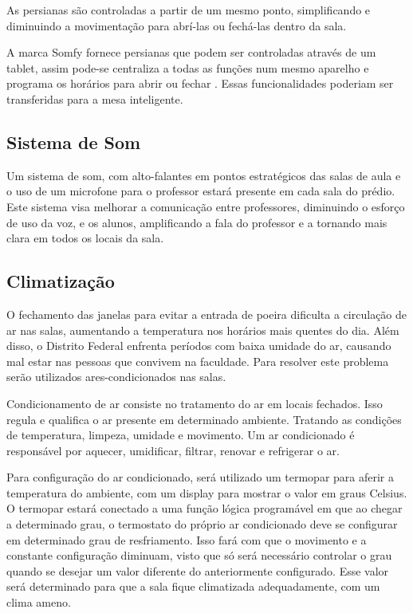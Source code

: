 As persianas são controladas a partir de um mesmo ponto, simplificando e diminuindo a movimentação para abrí-las ou fechá-las dentro da sala.

A marca Somfy fornece persianas que podem ser controladas através de um tablet, assim pode-se centraliza a todas as funções num mesmo aparelho e programa os horários para abrir ou fechar \cite{somfy2017}. Essas funcionalidades poderiam ser transferidas para a mesa inteligente.

\subsection{Sistema de Som}
Um sistema de som, com alto-falantes em pontos estratégicos das salas de aula e o uso de um microfone para o professor estará presente em cada sala do prédio. Este sistema visa melhorar a comunicação entre professores, diminuindo o esforço de uso da voz, e os alunos, amplificando a fala do professor e a tornando mais clara em todos os locais da sala.

\subsection{Climatização}
O fechamento das janelas para evitar a entrada de poeira dificulta a circulação de ar nas salas, aumentando a temperatura nos horários mais quentes do dia. Além disso, o Distrito Federal enfrenta períodos com baixa umidade do ar, causando mal estar nas pessoas que convivem na faculdade. Para resolver este problema serão utilizados ares-condicionados nas salas.

Condicionamento de ar consiste no tratamento do ar em locais fechados. Isso regula e qualifica o ar presente em determinado ambiente. Tratando as condições de temperatura, limpeza, umidade e movimento. Um ar condicionado é responsável por aquecer, umidificar, filtrar, renovar e refrigerar o ar.

Para configuração do ar condicionado, será utilizado um termopar para aferir a temperatura do ambiente, com um display para mostrar o valor em graus Celsius. O termopar estará conectado a uma função lógica programável em que ao chegar a determinado grau, o termostato do próprio ar condicionado deve se configurar em determinado grau de resfriamento. Isso fará com que o movimento e a constante configuração diminuam, visto que só será necessário controlar o grau quando se desejar um valor diferente do anteriormente configurado. Esse valor será determinado para que a sala fique climatizada adequadamente, com um clima ameno.

